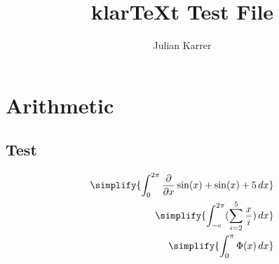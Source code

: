 \documentclass[oneside, a4paper]{article}
\author{Julian Karrer}
\title{klarTeXt Test File}
\begin{document}
\maketitle

\section*{Arithmetic}

\subsection*{Test}
\begin{program}
    \begin{align*}
        \simplify{\int_{0}^{2\pi} {\ddx{x}\sin(x)} + \sin(x) + 5 \,dx} \\
        \simplify{\int_{-e}^{2\pi} (\sum_{i=2}^{5} \frac{x}{i})\,dx}   \\
        \simplify{\int_{0}^{\pi} \Phi(x) \,dx}                         \\
    \end{align*}
\end{program}
\end{document}
